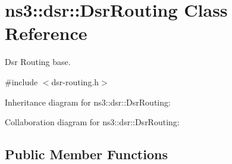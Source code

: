 \hypertarget{classns3_1_1dsr_1_1DsrRouting}{}\section{ns3\+:\+:dsr\+:\+:Dsr\+Routing Class Reference}
\label{classns3_1_1dsr_1_1DsrRouting}


Dsr Routing base.  




{\ttfamily \#include $<$dsr-\/routing.\+h$>$}



Inheritance diagram for ns3\+:\+:dsr\+:\+:Dsr\+Routing\+:


Collaboration diagram for ns3\+:\+:dsr\+:\+:Dsr\+Routing\+:
\subsection*{Public Member Functions}
